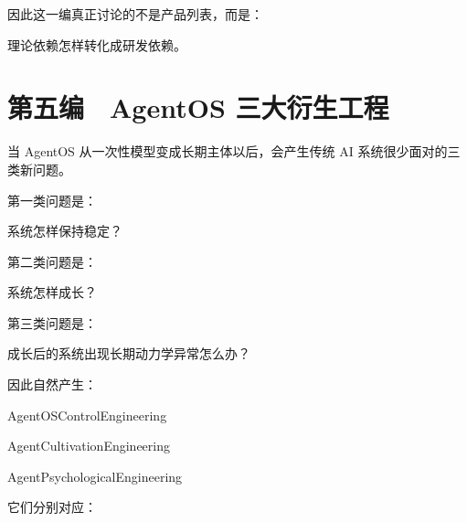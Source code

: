 因此这一编真正讨论的不是产品列表，而是：

\begin{statementbox}
理论依赖怎样转化成研发依赖。
\end{statementbox}

















\part{第五编　AgentOS 三大衍生工程}
当 AgentOS 从一次性模型变成长期主体以后，会产生传统 AI 系统很少面对的三类新问题。

第一类问题是：

\begin{statementbox}
系统怎样保持稳定？
\end{statementbox}

第二类问题是：

\begin{statementbox}
系统怎样成长？
\end{statementbox}

第三类问题是：

\begin{statementbox}
成长后的系统出现长期动力学异常怎么办？
\end{statementbox}

因此自然产生：

\begin{statementbox}
AgentOSControlEngineering
\end{statementbox}

\begin{statementbox}
AgentCultivationEngineering
\end{statementbox}

\begin{statementbox}
AgentPsychologicalEngineering
\end{statementbox}

它们分别对应：

\begin{statementbox}
\centering
{}
\end{statementbox}


